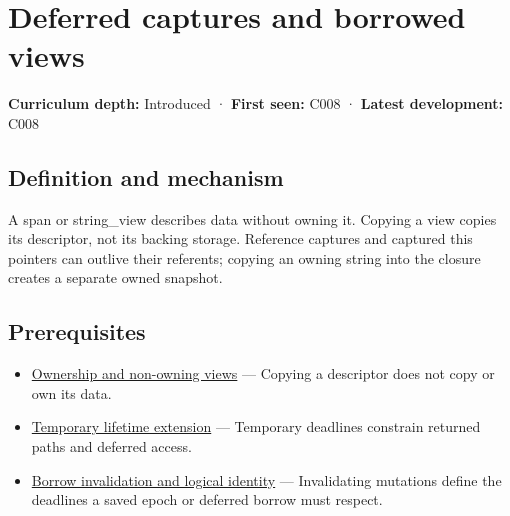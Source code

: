 \hypertarget{appendix-aea529eb5175}{}\label{referencestart:appendix-aea529eb5175}
\section{Deferred captures and borrowed views}\label{appendix-aea529eb5175-deferred-captures-and-borrowed-views}

\hypertarget{appendix-aea529eb5175-deferred-captures-and-borrowed-views}{}

\textbf{Curriculum depth:} Introduced · \textbf{First seen:} C008 · \textbf{Latest development:} C008

\begin{allmightroledefinition}

\subsection{Definition and mechanism}\label{appendix-aea529eb5175-definition-and-mechanism}

\hypertarget{appendix-aea529eb5175-definition-and-mechanism}{}

A span or string\_view describes data without owning it. Copying a view copies its descriptor, not its backing storage. Reference captures and captured this pointers can outlive their referents; copying an owning string into the closure creates a separate owned snapshot.

\end{allmightroledefinition}

\subsection{Prerequisites}\label{appendix-aea529eb5175-prerequisites}

\hypertarget{appendix-aea529eb5175-prerequisites}{}

\begin{itemize}
\tightlist
\item
  \hyperref[appendix-d52e4486f527]{Ownership and non-owning views} --- Copying a descriptor does not copy or own its data.
\item
  \hyperref[appendix-a978b29bbbb0]{Temporary lifetime extension} --- Temporary deadlines constrain returned paths and deferred access.
\item
  \hyperref[appendix-f9b8b9188c7f]{Borrow invalidation and logical identity} --- Invalidating mutations define the deadlines a saved epoch or deferred borrow must respect.
\end{itemize}

